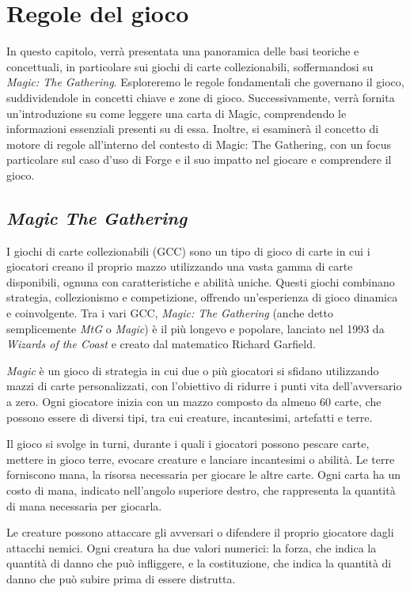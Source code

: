 \chapter{Regole del gioco}\label{chapter:background}
In questo capitolo, verrà presentata una panoramica delle basi teoriche e concettuali, in particolare sui giochi di carte collezionabili, soffermandosi su \emph{Magic: The Gathering}. Esploreremo le regole fondamentali che governano il gioco, suddividendole in concetti chiave e zone di gioco. Successivamente, verrà fornita un'introduzione su come leggere una carta di Magic, comprendendo le informazioni essenziali presenti su di essa. Inoltre, si esaminerà il concetto di motore di regole all'interno del contesto di Magic: The Gathering, con un focus particolare sul caso d'uso di Forge e il suo impatto nel giocare e comprendere il gioco.

\section{\textit{Magic The Gathering}}\label{sec:magic_the_gathering}
I giochi di carte collezionabili (GCC) sono un tipo di gioco di carte in cui i giocatori creano il proprio mazzo utilizzando una vasta gamma di carte disponibili, ognuna con caratteristiche e abilità uniche. Questi giochi combinano strategia, collezionismo e competizione, offrendo un'esperienza di gioco dinamica e coinvolgente. Tra i vari GCC, \emph{Magic: The Gathering} (anche detto semplicemente \emph{MtG} o \emph{Magic})  è il più longevo e popolare, lanciato nel 1993 da \emph{Wizards of the Coast} e creato dal matematico Richard Garfield.

\emph{Magic} è un gioco di strategia in cui due o più giocatori si sfidano utilizzando mazzi di carte personalizzati, con l'obiettivo di ridurre i punti vita dell'avversario a zero. Ogni giocatore inizia con un mazzo composto da almeno 60 carte, che possono essere di diversi tipi, tra cui creature, incantesimi, artefatti e terre.

Il gioco si svolge in turni, durante i quali i giocatori possono pescare carte, mettere in gioco terre, evocare creature e lanciare incantesimi o abilità. Le terre forniscono mana, la risorsa necessaria per giocare le altre carte. Ogni carta ha un costo di mana, indicato nell'angolo superiore destro, che rappresenta la quantità di mana necessaria per giocarla.

Le creature possono attaccare gli avversari o difendere il proprio giocatore dagli attacchi nemici. Ogni creatura ha due valori numerici: la forza, che indica la quantità di danno che può infliggere, e la costituzione, che indica la quantità di danno che può subire prima di essere distrutta.

